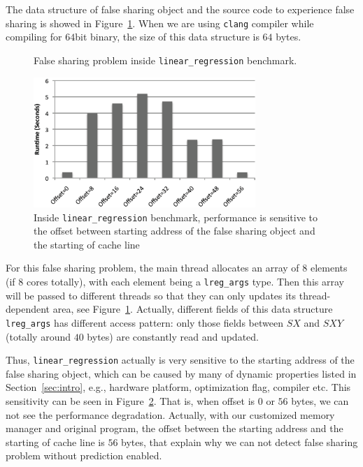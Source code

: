 The data structure of false sharing object and the source code
to experience false sharing is showed in Figure~\ref{fig:linearregression}. 
When we are using \texttt{clang} compiler while compiling for $64$bit binary, the size of this 
data structure is $64$ bytes.

\begin{figure}[!h]
{\centering
\subfigure{}
\caption{False sharing problem inside \texttt{linear\_regression} benchmark.
\label{fig:linearregression}}
}
\end{figure}

\begin{figure}[!h]
\begin{center}
\includegraphics[width=3.3in]{fig/perfsensitive}
\end{center}
\caption{
Inside \texttt{linear\_regression} benchmark,
performance is sensitive to the offset between starting address of the false sharing object 
and the starting of cache line 
\label{fig:perfsensitive}}
\end{figure}

For this false sharing problem, the main thread allocates an array of $8$ elements 
(if $8$ cores totally), 
with each element being a \texttt{lreg\_args} type. 
Then this array will be passed to different threads so that they can only updates its 
thread-dependent area, see Figure~\ref{fig:linearregression}.
Actually, different fields of this data structure \texttt{lreg\_args} has different access pattern:
only those fields between $SX$ and $SXY$ (totally around $40$ bytes) are constantly read and updated.

Thus, \texttt{linear\_regression} actually is very sensitive to the starting address 
of the false sharing object, which can be caused by many of dynamic properties 
listed in Section~\ref{sec:intro}, e.g.,
hardware platform, optimization flag, compiler etc.
This sensitivity can be seen in Figure~\ref{fig:perfsensitive}.
That is, when offset is $0$ or $56$ bytes, we can not see the performance degradation.
Actually, with our customized memory manager and original program,
the offset between the starting address and the starting of cache line is $56$ bytes,
that explain why we can not detect false sharing problem without prediction enabled.

